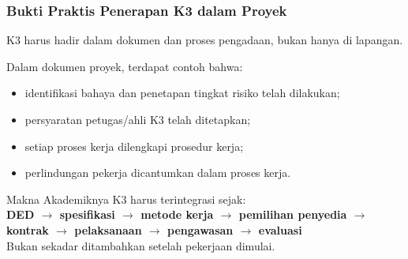 \documentclass[../main.tex]{subfiles}
\begin{document}
\begin{frame}[mytitle=standard,c,mycolor=white]
	\frametitle{Bukti Praktis Penerapan K3 dalam Proyek}

	K3 harus hadir dalam dokumen dan proses pengadaan, bukan hanya di lapangan.

	\begin{block}{Dalam dokumen proyek, terdapat contoh bahwa:}
		\begin{itemize}
			\item identifikasi bahaya dan penetapan tingkat risiko telah dilakukan;
			\item persyaratan petugas/ahli K3 telah ditetapkan;
			\item setiap proses kerja dilengkapi prosedur kerja;
			\item perlindungan pekerja dicantumkan dalam proses kerja.
		\end{itemize}
	\end{block}

	\begin{exampleblock}{Makna Akademiknya}
		K3 harus terintegrasi sejak: \\
		\textbf{DED $\rightarrow$ spesifikasi $\rightarrow$ metode kerja $\rightarrow$ pemilihan penyedia $\rightarrow$ kontrak $\rightarrow$ pelaksanaan $\rightarrow$ pengawasan $\rightarrow$ evaluasi}\\
		Bukan sekadar ditambahkan setelah pekerjaan dimulai.
	\end{exampleblock}
\end{frame}
\end{document}
